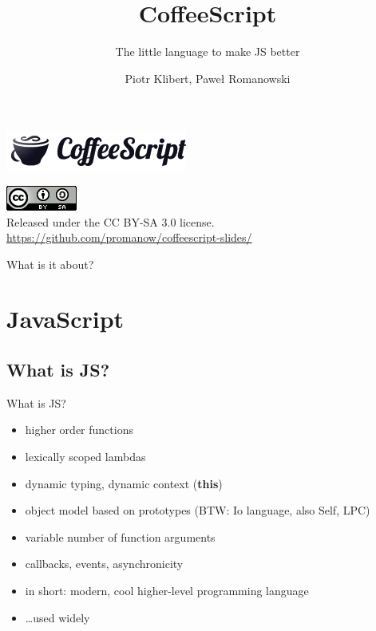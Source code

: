 \documentclass[xcolor=dvipsnames]{beamer}
\title{CoffeeScript}
\subtitle{The little language to make JS better}
\author{Piotr Klibert, Paweł Romanowski}
\newcommand{\slide}[1]{\begin{frame}[fragile]{{#1}}}
\begin{document}
\begin{frame}[plain]
    \begin{center}
        \includegraphics[scale=0.25]{img/logo.png}
    \end{center}

    \titlepage

    \begin{center}
        \includegraphics[scale=0.5]{img/cc.png} \\
        Released under the CC BY-SA 3.0 license. \\
        \vspace{0.5cm}
        \url{https://github.com/promanow/coffeescript-slides/}
    \end{center}

\end{frame}

\begin{frame}{What is it about?}
    \tableofcontents
\end{frame}



\section{JavaScript}


\subsection{What is JS?}
\slide{What is JS?}
    \begin{itemize}
        \item higher order functions
        \item lexically scoped lambdas
        \item dynamic typing, dynamic context (\textbf{this})
        \item object model based on prototypes (BTW: Io language, also Self, LPC)
        \item variable number of function arguments
        \item callbacks, events, asynchronicity

        \pause
        \vspace{0.5cm}

        \item in short: modern, cool higher-level programming language
        \item \ldots used widely
    \end{itemize}
\end{frame}
\end{document}
